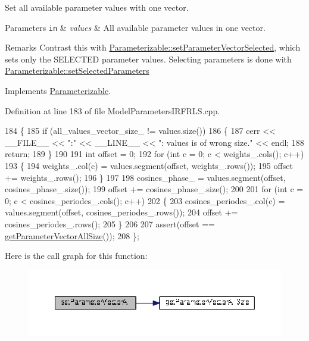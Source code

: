 Set all available parameter values with one vector. 


\begin{DoxyParams}[1]{Parameters}
\mbox{\tt in}  & {\em values} & All available parameter values in one vector. \\
\hline
\end{DoxyParams}
\begin{DoxyRemark}{Remarks}
Contrast this with \hyperlink{classDmpBbo_1_1Parameterizable_aee501e63a46d63eb58a6f271bf093b9d}{Parameterizable\+::set\+Parameter\+Vector\+Selected}, which sets only the S\+E\+L\+E\+C\+T\+E\+D parameter values. Selecting parameters is done with \hyperlink{classDmpBbo_1_1Parameterizable_a8a976b5db2d1809ece10e431816f0f27}{Parameterizable\+::set\+Selected\+Parameters} 
\end{DoxyRemark}


Implements \hyperlink{classDmpBbo_1_1Parameterizable_acef2ee975b497baf60b1f38da2b65f0d}{Parameterizable}.



Definition at line 183 of file Model\+Parameters\+I\+R\+F\+R\+L\+S.\+cpp.


\begin{DoxyCode}
184 \{
185   \textcolor{keywordflow}{if} (all\_values\_vector\_size\_ != values.size())
186   \{
187     cerr << \_\_FILE\_\_ << \textcolor{stringliteral}{":"} << \_\_LINE\_\_ << \textcolor{stringliteral}{": values is of wrong size."} << endl;
188     \textcolor{keywordflow}{return};
189   \}
190   
191   \textcolor{keywordtype}{int} offset = 0;
192   \textcolor{keywordflow}{for} (\textcolor{keywordtype}{int} c = 0; c < weights\_.cols(); c++)
193   \{
194     weights\_.col(c) = values.segment(offset, weights\_.rows());
195     offset += weights\_.rows();
196   \}
197   
198   cosines\_phase\_ = values.segment(offset, cosines\_phase\_.size());
199   offset += cosines\_phase\_.size();
200 
201   \textcolor{keywordflow}{for} (\textcolor{keywordtype}{int} c = 0; c < cosines\_periodes\_.cols(); c++)
202   \{
203     cosines\_periodes\_.col(c) = values.segment(offset, cosines\_periodes\_.rows());
204     offset += cosines\_periodes\_.rows();
205   \}
206 
207   assert(offset == \hyperlink{classDmpBbo_1_1ModelParametersIRFRLS_ab24d2485b3b795b516f4844f225100eb}{getParameterVectorAllSize}());   
208 \};
\end{DoxyCode}


Here is the call graph for this function\+:
\nopagebreak
\begin{figure}[H]
\begin{center}
\leavevmode
\includegraphics[width=350pt]{classDmpBbo_1_1ModelParametersIRFRLS_a9d3c8f22e8237a805af4935a647e5a50_cgraph}
\end{center}
\end{figure}


